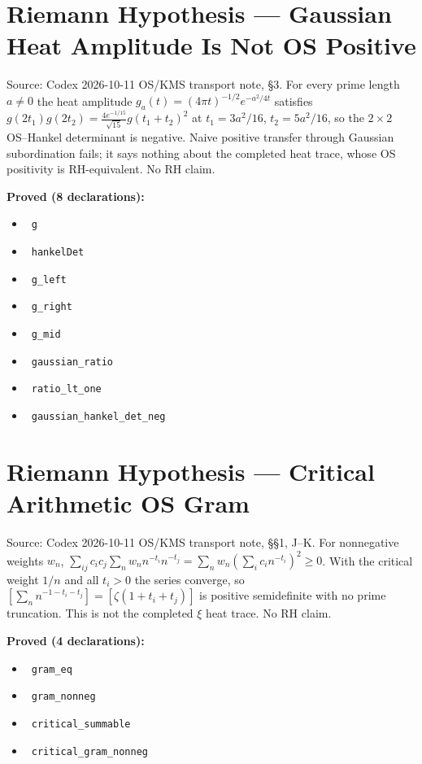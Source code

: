 \documentclass{report}
\theoremstyle{definition}
\begin{document}
\section{Riemann Hypothesis --- Gaussian Heat Amplitude Is Not OS Positive}
Source: Codex 2026-10-11 OS/KMS transport note, \S3. For every prime length $a\ne0$ the heat amplitude $g_a(t)=(4\pi t)^{-1/2}e^{-a^2/4t}$ satisfies $g(2t_1)g(2t_2)=\tfrac{4e^{-1/15}}{\sqrt{15}}g(t_1+t_2)^2$ at $t_1=3a^2/16$, $t_2=5a^2/16$, so the $2\times2$ OS--Hankel determinant is negative. Naive positive transfer through Gaussian subordination fails; it says nothing about the completed heat trace, whose OS positivity is RH-equivalent. No RH claim.

\noindent\textbf{Proved (8 declarations):}
\begin{itemize}
  \item {}\leanok\ \texttt{g}
  \item {}\leanok\ \texttt{hankelDet}
  \item {}\leanok\ \texttt{g\_left}
  \item {}\leanok\ \texttt{g\_right}
  \item {}\leanok\ \texttt{g\_mid}
  \item {}\leanok\ \texttt{gaussian\_ratio}
  \item {}\leanok\ \texttt{ratio\_lt\_one}
  \item {}\leanok\ \texttt{gaussian\_hankel\_det\_neg}
\end{itemize}

\section{Riemann Hypothesis --- Critical Arithmetic OS Gram}
Source: Codex 2026-10-11 OS/KMS transport note, \S\S1, J--K. For nonnegative weights $w_n$, $\sum_{ij}c_ic_j\sum_n w_n n^{-t_i}n^{-t_j}=\sum_n w_n(\sum_i c_in^{-t_i})^2\ge0$. With the critical weight $1/n$ and all $t_i>0$ the series converge, so $[\sum_n n^{-1-t_i-t_j}]=[\zeta(1+t_i+t_j)]$ is positive semidefinite with no prime truncation. This is not the completed $\xi$ heat trace. No RH claim.

\noindent\textbf{Proved (4 declarations):}
\begin{itemize}
  \item {}\leanok\ \texttt{gram\_eq}
  \item {}\leanok\ \texttt{gram\_nonneg}
  \item {}\leanok\ \texttt{critical\_summable}
  \item {}\leanok\ \texttt{critical\_gram\_nonneg}
\end{itemize}
\end{document}

